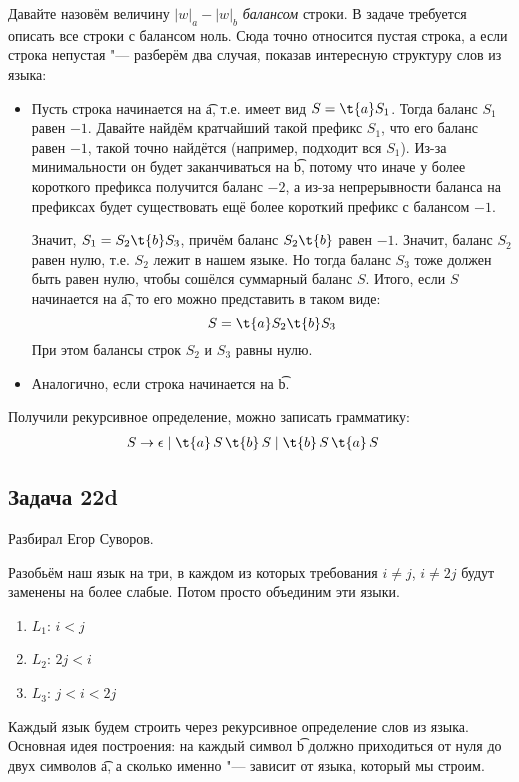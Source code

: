 	Давайте назовём величину $|w|_a-|w|_b$ \textit{балансом} строки.
	В задаче требуется описать все строки с балансом ноль.
	Сюда точно относится пустая строка, а если строка непустая "--- разберём два случая,
	показав интересную структуру слов из языка:
	\begin{itemize}
		\item
			Пусть строка начинается на \t{a}, т.е. имеет вид $S=\t{a}S_1$.
			Тогда баланс $S_1$ равен $-1$.
			Давайте найдём кратчайший такой префикс $S_1$, что его баланс равен $-1$,
			такой точно найдётся (например, подходит вся $S_1$).
			Из-за минимальности он будет заканчиваться на \t{b},
			потому что иначе у более короткого префикса получится баланс $-2$, а из-за
			непрерывности баланса на префиксах будет существовать ещё более короткий префикс с балансом $-1$.

			Значит, $S_1=S_2\t{b}S_3$, причём баланс $S_2\t{b}$ равен $-1$.
			Значит, баланс $S_2$ равен нулю, т.е. $S_2$ лежит в нашем языке.
			Но тогда баланс $S_3$ тоже должен быть равен нулю, чтобы сошёлся суммарный баланс $S$.
			Итого, если $S$ начинается на \t{a}, то его можно представить в таком виде:
			\[ S = \t{a}S_2\t{b}S_3 \]
			При этом балансы строк $S_2$ и $S_3$ равны нулю.
		\item
			Аналогично, если строка начинается на \t{b}.
	\end{itemize}
	Получили рекурсивное определение, можно записать грамматику:
	\begin{align*}
		S &\to \epsilon \mid \t{a}\,S\,\t{b}\,S \mid \t{b}\,S\,\t{a}\,S
	\end{align*}

\subsection{Задача 22d}
	Разбирал Егор Суворов.

	Разобьём наш язык на три, в каждом из которых требования $i \neq j$, $i \neq 2j$ будут заменены на более слабые.
	Потом просто объединим эти языки.
	\begin{enumerate}
		\item $L_1$: $i < j$
		\item $L_2$: $2j < i$
		\item $L_3$: $j < i < 2j$
	\end{enumerate}
	Каждый язык будем строить через рекурсивное определение слов из языка.
	Основная идея построения: на каждый символ \t{b} должно приходиться от нуля до двух символов \t{a},
	а сколько именно "--- зависит от языка, который мы строим.

